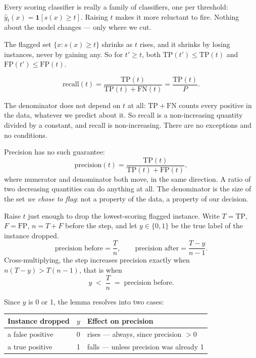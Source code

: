 \documentclass[11pt,a4paper]{article}
\begin{document}
Every scoring classifier is really a family of classifiers, one per threshold:
$\hat y_t(x) = \mathbf{1}[s(x) \ge t]$. Raising $t$ makes it more reluctant to
fire. Nothing about the model changes --- only where we cut.

The flagged set $\{x : s(x) \ge t\}$ shrinks as $t$ rises, and it shrinks by
losing instances, never by gaining any. So for $t' \ge t$, both
$\mathrm{TP}(t') \le \mathrm{TP}(t)$ and $\mathrm{FP}(t') \le \mathrm{FP}(t)$.

\[ \text{recall}(t) = \frac{\mathrm{TP}(t)}{\mathrm{TP}(t) + \mathrm{FN}(t)}
   = \frac{\mathrm{TP}(t)}{P}. \]

The denominator does not depend on $t$ at all: $\mathrm{TP} + \mathrm{FN}$
counts every positive in the data, whatever we predict about it. So recall is a
non-increasing quantity divided by a constant, and recall is non-increasing.
There are no exceptions and no conditions.

Precision has no such guarantee:
\[ \text{precision}(t) =
   \frac{\mathrm{TP}(t)}{\mathrm{TP}(t) + \mathrm{FP}(t)}, \]
where numerator and denominator both move, in the same direction. A ratio of
two decreasing quantities can do anything at all. The denominator is the size
of the set \emph{we chose to flag}: not a property of the data, a property of
our decision.

\begin{derivbox}[title={The one-step lemma}]
Raise $t$ just enough to drop the lowest-scoring flagged instance. Write
$T = \mathrm{TP}$, $F = \mathrm{FP}$, $n = T + F$ before the step, and let
$y \in \{0,1\}$ be the true label of the instance dropped.
\[ \text{precision before} = \frac{T}{n}, \qquad
   \text{precision after}  = \frac{T - y}{n - 1}. \]
Cross-multiplying, the step increases precision exactly when
$n(T-y) > T(n-1)$, that is when
\[ y \;<\; \frac{T}{n} \;=\; \text{precision before}. \]
\end{derivbox}

Since $y$ is 0 or 1, the lemma resolves into two cases:

\begin{center}
\small
\begin{tabular}{llp{}}
\toprule
\textbf{Instance dropped} & \textbf{$y$} & \textbf{Effect on precision} \\
\midrule
a false positive & 0 & rises --- always, since precision $> 0$ \\
a true positive  & 1 & falls --- unless precision was already 1 \\
\bottomrule
\end{tabular}
\end{center}
\end{document}

